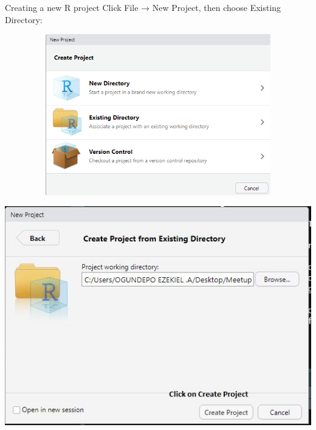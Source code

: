 \documentclass[
  ignorenonframetext,
]{beamer}
\begin{document}
\begin{frame}{Creating a new R project}
\pause
Click File → New Project, then choose Existing Directory:
\begin{figure}
	\centering
	\includegraphics[height=7cm, width= 12cm]{Images/step1.PNG}
\end{figure}
\end{frame}

\begin{frame}{}
\protect\hypertarget{section-3}{}

\includegraphics{Images/step2.JPG}

\end{frame}
\end{document}
